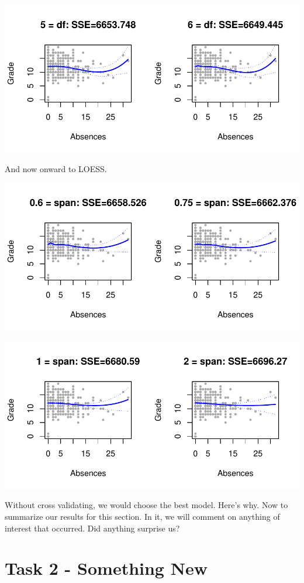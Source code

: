 \documentclass{article}
\begin{document}
\includegraphics{Report_4-010}

And now onward to LOESS.

\includegraphics{Report_4-011}

\includegraphics{Report_4-012}

Without cross validating, we would choose the best model. Here's why.
Now to summarize our results for this section. In it, we will comment on anything of interest that occurred. Did anything surprise us? 

\section{Task 2 - Something New}
\end{document}
